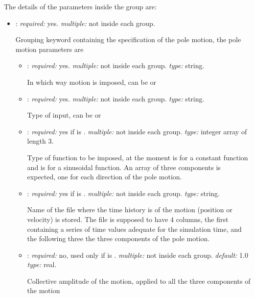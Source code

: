 The details of the parameters inside the  group are:
\begin{itemize}
\item {}: \textit{required:} yes. \textit{multiple:} not inside each  group.

Grouping keyword containing the specification of the pole motion, the pole motion parameters are

	\begin{itemize}
	\item {}: \textit{required:} yes. \textit{multiple:} not inside each  group. \textit{type:} string.
    
    In which way motion is imposed, can be  or 
    
    \item {}: \textit{required:} yes. \textit{multiple:} not inside each  group. \textit{type:} string.
    
    Type of input, can be  or 
    
    \item {}: \textit{required:} yes if  is . \textit{multiple:} not inside each  group. \textit{type:} integer array of length 3.
    
    Type of function to be imposed, at the moment  is for a constant function and  is for a sinusoidal function. An array of three components is expected, one for each direction of the pole motion.
    
        \item {}: \textit{required:} yes if  is . \textit{multiple:} not inside each  group. \textit{type:} string.
        
        Name of the file where the time history is of the motion (position or velocity) is stored. The file is supposed to have 4 columns, the first containing a series of time values adequate for the simulation time, and the following three the three components of the pole motion. 
        
    \item {}: \textit{required:} no, used only if  is . \textit{multiple:} not inside each  group. \textit{default:} 1.0 \textit{type:} real.
    
    Collective amplitude of the motion, applied to all the three components of the motion    
    

\end{itemize}
\end{itemize}
